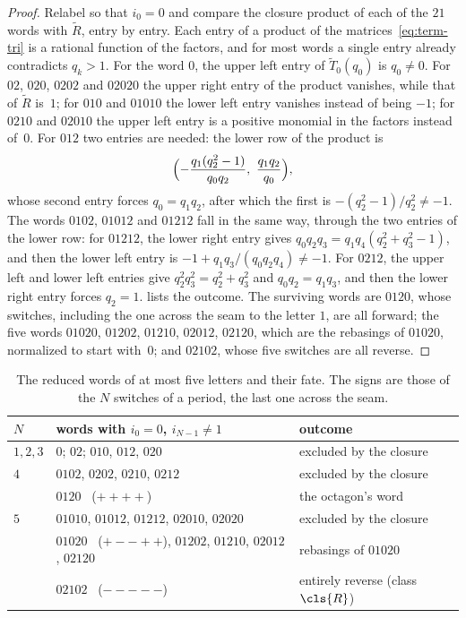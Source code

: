 \begin{proof}
Relabel so that $i_0=0$ and compare the closure product of each of the $21$ words with
$\widetilde R$, entry by entry. Each entry of a product of the matrices~\eqref{eq:term-tri} is
a rational function of the factors, and for most words a single entry already contradicts
$q_k>1$. For the word $0$, the upper left entry of $\widetilde T_0(q_0)$ is $q_0\neq0$. For
$02$, $020$, $0202$ and $02020$ the upper right entry of the product vanishes, while that of
$\widetilde R$ is~$1$; for $010$ and $01010$ the lower left entry vanishes instead of being
$-1$; for $0210$ and $02010$ the upper left entry is a positive monomial in the factors instead
of~$0$. For $012$ two entries are needed: the lower row of the product is
\[
 \Bigl(-\frac{q_1(q_2^2-1)}{q_0q_2},\ \frac{q_1q_2}{q_0}\Bigr),
\]
whose second entry forces $q_0=q_1q_2$, after which the first is $-(q_2^2-1)/q_2^2\ne-1$. The
words $0102$, $01012$ and $01212$ fall in the same way, through the two entries of the lower row:
for $01212$, the lower right entry gives $q_0q_2q_3=q_1q_4(q_2^2+q_3^2-1)$, and then the lower left
entry is $-1+q_1q_3/(q_0q_2q_4)\ne-1$. For $0212$, the upper left and lower left entries give
$q_2^2q_3^2=q_2^2+q_3^2$ and $q_0q_2=q_1q_3$, and then the lower right entry forces $q_2=1$.  lists the outcome. The surviving words are
$0120$, whose switches, including the one across the seam to the letter $1$, are all forward;
the five words $01020$, $01202$, $01210$, $02012$, $02120$, which are the rebasings of $01020$,
normalized to start with~$0$; and $02102$, whose five switches are all reverse.
\end{proof}

\begin{table}[htbp]
\centering
\begin{tabular}{@{}l>{\raggedright\arraybackslash}p{}l@{}}
\toprule
$N$ & words with $i_0=0$, $i_{N-1}\ne1$ & outcome\\
\midrule
$1,2,3$ & $0$; $02$; $010$, $012$, $020$ & excluded by the closure\\
$4$ & $0102$, $0202$, $0210$, $0212$ & excluded by the closure\\
    & $0120$ \ ($++++$) & the octagon's word\\
$5$ & $01010$, $01012$, $01212$, $02010$, $02020$ & excluded by the closure\\
    & $01020$ \ ($+--++$), $01202$, $01210$, $02012$, $02120$ & rebasings of $01020$\\
    & $02102$ \ ($-----$) & entirely reverse (class $\cls{R}$)\\
\bottomrule
\end{tabular}
\caption{The reduced words of at most five letters and their fate. The signs are those of the
$N$ switches of a period, the last one across the seam.}
\label{tab:terminal-words}
\end{table}

